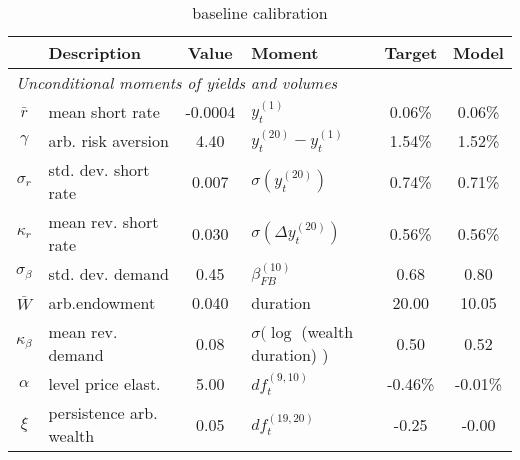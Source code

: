 \begin{table}[htbp]  
\centering  
\bgroup  
\def\arraystretch{1.25}  
\begin{tabular}{clclcc} \hline  
& Description & Value & Moment & Target & Model \\ \hline  
\multicolumn{6}{l}{\emph{Unconditional moments of yields and volumes}} \\  
$\bar{r}$  & mean short rate & -0.0004  & $y_{t}^{(1)}$ & 0.06\% & 0.06\%   \\ 
$\gamma$  & arb. risk aversion & 4.40  & $y_{t}^{(20)}-y_{t}^{(1)}$ & 1.54\% & 1.52\%   \\ 
$\sigma_r$ & std. dev. short rate & 0.007 & $\sigma ( y_{t}^{(20)} )$  & 0.74\% & 0.71\% \\ 
$\kappa_r$ & mean rev. short rate & 0.030 & $\sigma (\Delta y_{t}^{(20)})$ & 0.56\% & 0.56\% \\ 
$\sigma_{\beta}$ & std. dev. demand & 0.45 & $ \beta^{(10)}_{FB} $ & 0.68 & 0.80 \\ 
$\bar{W}$ & arb.endowment & 0.040 & duration & 20.00 & 10.05 \\ 
$\kappa_{\beta}$ & mean rev. demand & 0.08 & $\sigma (\log $ (wealth duration) ) & 0.50 & 0.52 \\ 
$\alpha$ & level price elast. & 5.00 & $ df_t^{(9,10)} $ & -0.46\% & -0.01\% \\ 
$\xi$ & persistence arb. wealth & 0.05 & $ df_t^{(19,20)} $ & -0.25 & -0.00 \\ 
\end{tabular} 
\egroup 
\caption{baseline calibration} 
\label{tab:cal} 
\end{table} 
